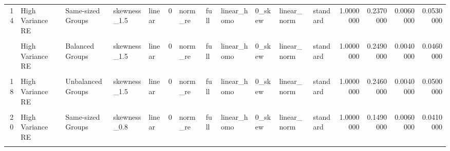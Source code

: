 \documentclass[12pt]{article}
\begin{document}
\begin{table}
{\begin{tabular}[t]{rllllrllllllrrrr}
14 & High Variance RE & Same-sized Groups & skewness\_1.5 & linear & 0 & norm\_re & full & linear\_homo & 0\_skew & linear\_norm & standard & 1.0000000 & 0.2370000 & 0.0060000 & 0.0530000\\
\cellcolor{gray!6}{15} & \cellcolor{gray!6}{High Variance Error} & \cellcolor{gray!6}{Balanced Groups} & \cellcolor{gray!6}{skewness\_1.5} & \cellcolor{gray!6}{linear} & \cellcolor{gray!6}{0} & \cellcolor{gray!6}{norm\_re} & \cellcolor{gray!6}{full} & \cellcolor{gray!6}{linear\_homo} & \cellcolor{gray!6}{0\_skew} & \cellcolor{gray!6}{linear\_norm} & \cellcolor{gray!6}{standard} & \cellcolor{gray!6}{1.0000000} & \cellcolor{gray!6}{0.8670000} & \cellcolor{gray!6}{0.0830000} & \cellcolor{gray!6}{0.0480000}\\
\addlinespace
16 & High Variance RE & Balanced Groups & skewness\_1.5 & linear & 0 & norm\_re & full & linear\_homo & 0\_skew & linear\_norm & standard & 1.0000000 & 0.2490000 & 0.0040000 & 0.0460000\\
\cellcolor{gray!6}{17} & \cellcolor{gray!6}{High Variance Error} & \cellcolor{gray!6}{Unbalanced Groups} & \cellcolor{gray!6}{skewness\_1.5} & \cellcolor{gray!6}{linear} & \cellcolor{gray!6}{0} & \cellcolor{gray!6}{norm\_re} & \cellcolor{gray!6}{full} & \cellcolor{gray!6}{linear\_homo} & \cellcolor{gray!6}{0\_skew} & \cellcolor{gray!6}{linear\_norm} & \cellcolor{gray!6}{standard} & \cellcolor{gray!6}{1.0000000} & \cellcolor{gray!6}{0.8290000} & \cellcolor{gray!6}{0.0740000} & \cellcolor{gray!6}{0.0510000}\\
18 & High Variance RE & Unbalanced Groups & skewness\_1.5 & linear & 0 & norm\_re & full & linear\_homo & 0\_skew & linear\_norm & standard & 1.0000000 & 0.2460000 & 0.0040000 & 0.0500000\\
\cellcolor{gray!6}{19} & \cellcolor{gray!6}{High Variance Error} & \cellcolor{gray!6}{Same-sized Groups} & \cellcolor{gray!6}{skewness\_0.8} & \cellcolor{gray!6}{linear} & \cellcolor{gray!6}{0} & \cellcolor{gray!6}{norm\_re} & \cellcolor{gray!6}{full} & \cellcolor{gray!6}{linear\_homo} & \cellcolor{gray!6}{0\_skew} & \cellcolor{gray!6}{linear\_norm} & \cellcolor{gray!6}{standard} & \cellcolor{gray!6}{1.0000000} & \cellcolor{gray!6}{0.5000000} & \cellcolor{gray!6}{0.0920000} & \cellcolor{gray!6}{0.0610000}\\
20 & High Variance RE & Same-sized Groups & skewness\_0.8 & linear & 0 & norm\_re & full & linear\_homo & 0\_skew & linear\_norm & standard & 1.0000000 & 0.1490000 & 0.0060000 & 0.0410000\\
\addlinespace

\end{tabular}}
\end{table}
\end{document}
